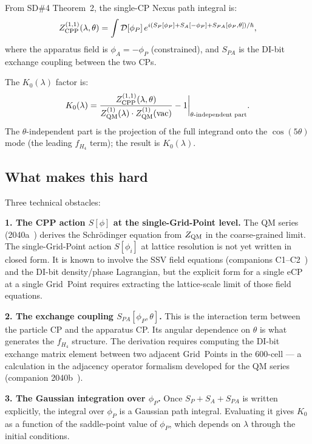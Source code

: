\documentclass[11pt,a4paper]{article}
\begin{document}
From SD\#4 Theorem~2, the single-CP Nexus path integral is:
\begin{equation}
Z_{\rm CPP}^{(1,1)}(\lambda,\theta)
= \int \mathcal{D}[\phi_P]\,
  e^{i(S_P[\phi_P] + S_A[-\phi_P] + S_{PA}[\phi_P,\theta])/\hbar},
\label{eq:Z_single}
\end{equation}
where the apparatus field is $\phi_A = -\phi_P$ (constrained),
and $S_{PA}$ is the DI-bit exchange coupling between the two CPs.

The $K_0(\lambda)$ factor is:
\begin{equation}
K_0(\lambda) = \frac{Z_{\rm CPP}^{(1,1)}(\lambda,\theta)}
                    {Z_{\rm QM}^{(1)}(\lambda) \cdot Z_{\rm QM}^{(1)}(\text{vac})}
               - 1 \bigg|_{\theta\text{-independent part}}.
\label{eq:K0_def}
\end{equation}
The $\theta$-independent part is the projection of the full
integrand onto the $\cos(5\theta)$ mode (the leading $f_{H_4}$ term);
the result is $K_0(\lambda)$.

\subsection{What makes this hard}

Three technical obstacles:

\textbf{1. The CPP action $S[\phi]$ at the single-Grid-Point level.}
The QM series (2040a~\citep{cpp2040a}) derives the Schrödinger
equation from $Z_{\rm QM}$ in the coarse-grained limit.  The
single-Grid-Point action $S[\phi_i]$ at lattice resolution is
not yet written in closed form.  It is known to involve the
SSV field equations (companions C1--C2~\citep{abshier_sr}) and
the DI-bit density/phase Lagrangian, but the explicit form for
a single eCP at a single Grid~Point requires extracting the
lattice-scale limit of those field equations.

\textbf{2. The exchange coupling $S_{PA}[\phi_P, \theta]$.}
This is the interaction term between the particle CP and the
apparatus CP.  Its angular dependence on $\theta$ is what
generates the $f_{H_4}$ structure.  The derivation requires
computing the DI-bit exchange matrix element between two
adjacent Grid~Points in the 600-cell --- a calculation in
the adjacency operator formalism developed for the QM series
(companion 2040b~\citep{cpp2040b}).

\textbf{3. The Gaussian integration over $\phi_P$.}
Once $S_P + S_A + S_{PA}$ is written explicitly, the integral
over $\phi_P$ is a Gaussian path integral.  Evaluating it
gives $K_0$ as a function of the saddle-point value of
$\phi_P$, which depends on $\lambda$ through the initial
conditions.
\end{document}
